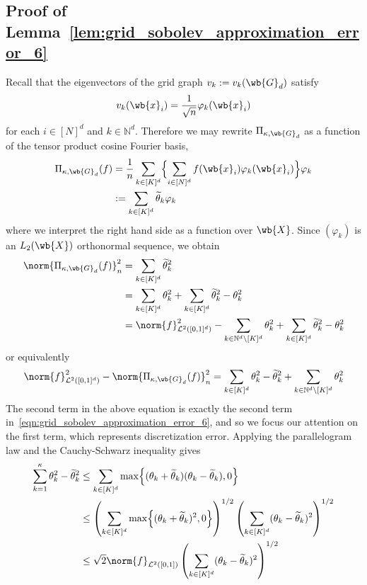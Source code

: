 \documentclass{article}
\newcommand{\1}{\mathbf{1}}
\newcommand{\Nbb}{\mathbb{N}}
\newcommand{\Leb}{\mathcal{L}}
\newcommand{\wt}[1]{\widetilde{#1}}
\theoremstyle{alden}
\theoremstyle{aldenthm}
\theoremstyle{definition}
\theoremstyle{remark}
\begin{document}
\subsection{Proof of Lemma~\ref{lem:grid_sobolev_approximation_error_6}}
Recall that the eigenvectors of the grid graph $v_k := v_k(\wb{G}_d)$ satisfy
\begin{equation*}
v_{k}(\wb{x}_i) = \frac{1}{\sqrt{n}} \varphi_{k}(\wb{x}_i)
\end{equation*}
for each $i \in [N]^d$ and $k \in \mathbb{N}^d$. Therefore we may rewrite $\Pi_{\kappa,\wb{G}_d}$ as a function of the tensor product cosine Fourier basis,
\begin{align*}
\Pi_{\kappa,\wb{G}_d}(f) & = \frac{1}{n} \sum_{k \in [K]^d} \Bigl\{\sum_{i \in [N]^d} f(\wb{x}_i) \varphi_k(\wb{x}_i)\Bigr\} \varphi_k \\
& :=  \sum_{k \in [K]^d} \wt{\theta}_k \varphi_k
\end{align*}
where we interpret the right hand side as a function over $\wb{X}$. Since $(\varphi_k)$ is an $L_2(\wb{X})$ orthonormal sequence, we obtain
\begin{align*}
\norm{\Pi_{\kappa,\wb{G}_d}(f)}_n^2 & = \sum_{k \in [K]^d} \wt{\theta}_k^2 \\ 
& = \sum_{k \in [K]^d} {\theta}_k^2 + \sum_{k \in [K]^d} \wt{\theta}_k^2 - \theta_k^2 \\
& = \norm{f}_{\Leb^2([0,1]^d)}^2 - \sum_{k \in \Nbb^d \setminus [K]^d} \theta_k^2 + \sum_{k \in [K]^d} \wt{\theta}_k^2 - \theta_k^2
\end{align*}
or equivalently
\begin{equation*}
\norm{f}_{\Leb^2([0,1]^d)}^2 - \norm{\Pi_{\kappa,\wb{G}_d}(f)}_n^2 = \sum_{k \in [K]^d} \theta_k^2 - \wt{\theta}_k^2 + \sum_{k \in \Nbb^d \setminus [K]^d} \theta_k^2
\end{equation*}
The second term in the above equation is exactly the second term in~\eqref{eqn:grid_sobolev_approximation_error_6}, and so we focus our attention on the first term, which represents discretization error. Applying the parallelogram law and the Cauchy-Schwarz inequality gives
\begin{equation}
\label{eqn:grid_sobolev_approximation_error6_pf1}
\begin{aligned}
\sum_{k = 1}^{\kappa} \theta_k^2 - \wt{\theta}_k^2 & \leq \sum_{k \in [K]^d} \max\Bigl\{(\theta_k + \wt{\theta}_k)(\theta_k - \wt{\theta}_k),0\Bigr\} \\
& \leq \left(\sum_{k \in [K]^d} \max\Bigl\{(\theta_k + \wt{\theta}_k)^2,0\Bigr\}\right)^{1/2} \left(\sum_{k \in [K]^d} (\theta_k - \wt{\theta}_k)^2\right)^{1/2} \\
& \leq \sqrt{2} \norm{f}_{\Leb^2([0,1])} \left(\sum_{k \in [K]^d} (\theta_k - \wt{\theta}_k)^2\right)^{1/2}
\end{aligned}
\end{equation}
\end{document}
